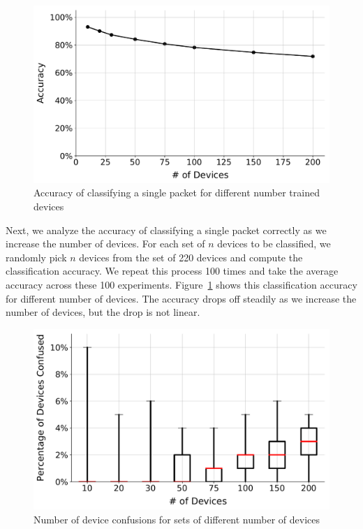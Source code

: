 \begin{figure}
    \centering
    \includegraphics[width = \linewidth]{plots/accuracy_device.pdf}
    \caption{Accuracy of classifying a single packet for different number trained devices}
    \label{fig:15}
\end{figure}



Next, we analyze the accuracy of classifying a single packet correctly as we
increase the number of devices. For each set of $n$ devices to be classified,
we randomly pick $n$ devices from the set of 220 devices and compute the
classification accuracy.  We repeat this process 100 times and take the average
accuracy across these 100 experiments. Figure~\ref{fig:15} shows this
classification accuracy for different number of devices. The accuracy drops off
steadily as we increase the number of devices, but the drop is not linear.


\begin{figure}
    \centering
    \includegraphics[width = \linewidth]{plots/box_whisker.pdf}
    \caption{Number of device confusions for sets of different number of devices}
    \label{fig:16}
\end{figure}


